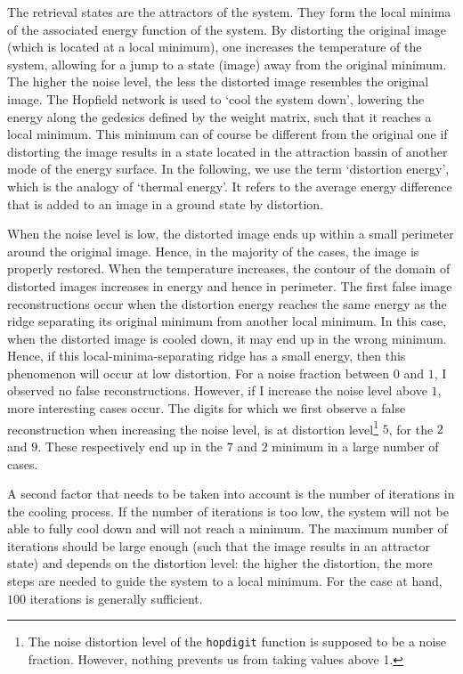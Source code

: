 \documentclass[pdftex,11pt,a4paper]{article}
\begin{document}
The retrieval states are the attractors of the system. They form the local minima of the associated energy function of the system. By distorting the original image (which is located at a local minimum), one increases the temperature of the system, allowing for a jump to a state (image) away from the original minimum. The higher the noise level, the less the distorted image resembles the original image. The Hopfield network is used to `cool the system down', lowering the energy along the gedesics defined by the weight matrix, such that it reaches a local minimum. This minimum can of course be different from the original one if distorting the image results in a state located in the attraction bassin of another mode of the energy surface. In the following, we use the term `distortion energy', which is the analogy of `thermal energy'. It refers to the average energy difference that is added to an image in a ground state by distortion. 

When the noise level is low, the distorted image ends up within a small perimeter around the original image. Hence, in the majority of the cases, the image is properly restored.
When the temperature increases, the contour of the domain of distorted images increases in energy and hence in perimeter. The first false image reconstructions occur when the distortion energy reaches the same energy as the ridge separating its original minimum from another local minimum. In this case, when the distorted image is cooled down, it may end up in the wrong minimum. Hence, if this local-minima-separating ridge has a small energy, then this phenomenon will occur at low distortion.  For a noise fraction between $0$ and $1$, I observed no false reconstructions. However, if I increase the noise level above $1$, more interesting cases occur. The digits for which we first observe a false reconstruction when increasing the noise level, is at distortion level\footnote{The noise distortion level of the \texttt{hopdigit} function is supposed to be a noise fraction. However, nothing prevents us from taking values above 1.} $5$, for the $2$ and $9$. These respectively end up in the $7$ and $2$ minimum in a large number of cases.

A second factor that needs to be taken into account is the number of iterations in the cooling process. If the number of iterations is too low, the system will not be able to fully cool down and will not reach a minimum. The maximum number of iterations should be large enough (such that the image results in an attractor state) and depends on the distortion level: the higher the distortion, the more steps are needed to guide the system to a local minimum. For the case at hand, $100$ iterations is generally sufficient.
\end{document}
